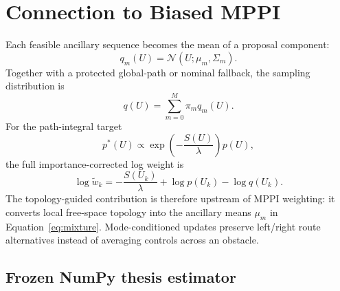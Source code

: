 \documentclass[11pt,a4paper]{article}
\newcommand{\N}{\mathcal{N}}
\begin{document}
\section{Connection to Biased MPPI}

Each feasible ancillary sequence becomes the mean of a proposal component:
\begin{equation}
  q_m(U)=\N(U;\mu_m,\Sigma_m).
\end{equation}
Together with a protected global-path or nominal fallback, the sampling
distribution is
\begin{equation}
  q(U)=\sum_{m=0}^{M}\pi_m q_m(U).
  \label{eq:mixture}
\end{equation}
For the path-integral target
\begin{equation}
  p^*(U)\propto
  \exp\left(-\frac{S(U)}{\lambda}\right)p(U),
\end{equation}
the full importance-corrected log weight is
\begin{equation}
  \log\widetilde w_k
  =-\frac{S(U_k)}{\lambda}
   +\log p(U_k)-\log q(U_k).
  \label{eq:importance}
\end{equation}
The topology-guided contribution is therefore upstream of MPPI weighting: it converts
local free-space topology into the ancillary means $\mu_m$ in
Equation~\eqref{eq:mixture}. Mode-conditioned updates preserve left/right
route alternatives instead of averaging controls across an obstacle.

\subsection{Frozen NumPy thesis estimator}
\end{document}
